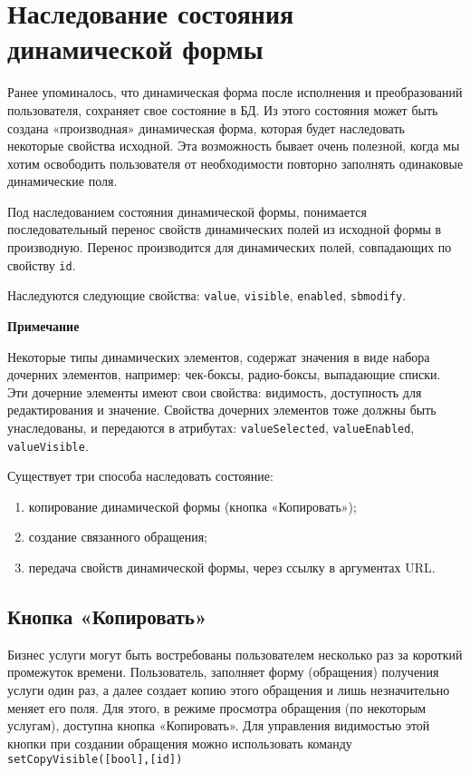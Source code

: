 \documentclass[../index.tex]{subfiles}
\begin{document}
\section{Наследование состояния\\динамической формы}
Ранее упоминалось, что динамическая форма после исполнения и преобразований пользователя,
сохраняет свое состояние в БД. Из этого состояния может быть создана «производная» динамическая форма,
которая будет наследовать некоторые свойства исходной. Эта возможность бывает очень полезной,
когда мы хотим освободить пользователя от необходимости повторно заполнять одинаковые динамические поля.

Под наследованием состояния динамической формы, понимается последовательный перенос свойств динамических полей
из исходной формы в производную. Перенос производится для динамических полей, совпадающих по свойству \verb|id|.

Наследуются следующие свойства: \verb|value|, \verb|visible|, \verb|enabled|, \verb|sbmodify|.

\textbf{Примечание}

Некоторые типы динамических элементов, содержат значения в виде набора дочерних элементов,
например: чек-боксы, радио-боксы, выпадающие списки. Эти дочерние элементы имеют свои
свойства: видимость, доступность для редактирования и значение.
Свойства дочерних элементов тоже должны быть унаследованы, и передаются в
атрибутах: \verb|valueSelected|, \verb|valueEnabled|, \verb|valueVisible|.

Существует три способа наследовать состояние:

\begin{enumerate}
	\item копирование динамической формы (кнопка «Копировать»);
	\item создание связанного обращения;
    \item передача свойств динамической формы, через ссылку в аргументах URL.
\end{enumerate}

\subsection{Кнопка «Копировать»}
Бизнес услуги могут быть востребованы пользователем несколько раз за короткий промежуток времени.
Пользователь, заполняет форму (обращения) получения услуги один раз, а далее создает копию этого обращения
и лишь незначительно меняет его поля. Для этого, в режиме просмотра обращения (по некоторым услугам),
доступна кнопка «Копировать». Для управления видимостью этой кнопки при создании обращения можно использовать команду
\verb|setCopyVisible([bool],[id])|
\end{document}

